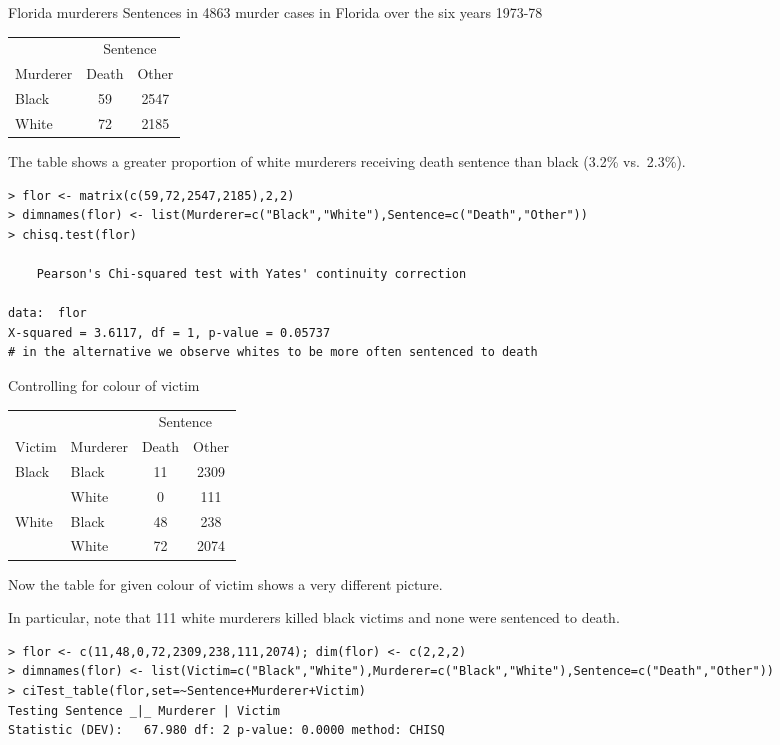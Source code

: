 \documentclass[dvipsnames,aspectratio=169]{beamer} %
\begin{document}
\begin{frame}[fragile,label=SP2]{Florida murderers}
Sentences in 4863 murder cases in Florida over the six
years 1973-78
\begin{center}
\begin{tabular}{lcc} \hline
&\multicolumn{2}{c}{Sentence}\\
\cline{2-3}
Murderer&Death&Other\\
\hline Black&59&2547\\ White&72&2185\\
\hline
\end{tabular}
\end{center}
The table shows a greater proportion
 of white murderers receiving death sentence than black
(3.2\% vs.\ 2.3\%).
	\begin{lstlisting}
> flor <- matrix(c(59,72,2547,2185),2,2)
> dimnames(flor) <- list(Murderer=c("Black","White"),Sentence=c("Death","Other"))
> chisq.test(flor)

	Pearson's Chi-squared test with Yates' continuity correction

data:  flor
X-squared = 3.6117, df = 1, p-value = 0.05737
# in the alternative we observe whites to be more often sentenced to death
\end{lstlisting}
\end{frame}

\begin{frame}[fragile]{Controlling for colour of victim}
\begin{center}
\begin{tabular}{llcc}
\hline
&&\multicolumn{2}{c}{Sentence}\\
\cline{3-4}
Victim&Murderer&Death&Other\\
\hline
Black&Black&11&2309\\
&White&0&111\\
White&Black&48&238\\
&White&72&2074\\
\hline
\end{tabular}
\end{center}
Now the table for given colour
of victim shows a very different picture.


\smallskip

 In particular,
note that 111 white murderers killed black victims and
none were sentenced to death.
	\begin{lstlisting}
> flor <- c(11,48,0,72,2309,238,111,2074); dim(flor) <- c(2,2,2)
> dimnames(flor) <- list(Victim=c("Black","White"),Murderer=c("Black","White"),Sentence=c("Death","Other"))
> ciTest_table(flor,set=~Sentence+Murderer+Victim)
Testing Sentence _|_ Murderer | Victim 
Statistic (DEV):   67.980 df: 2 p-value: 0.0000 method: CHISQ
 \end{lstlisting}
\end{frame}
\end{document}

